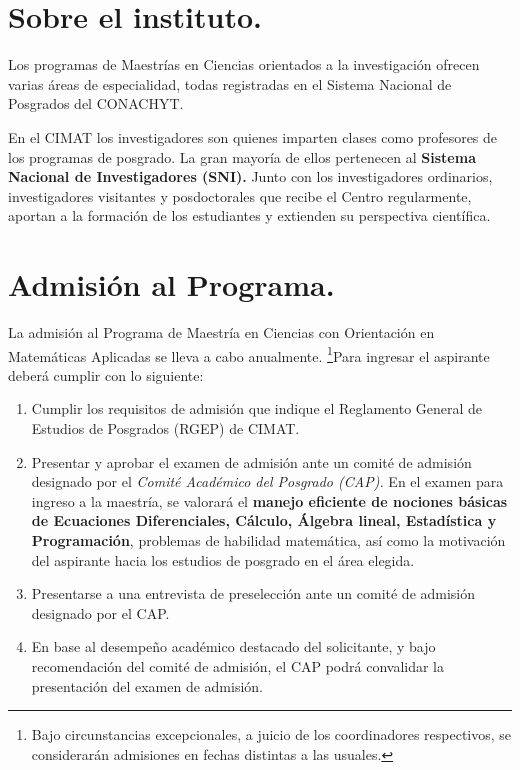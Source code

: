 \documentclass[10pt,a4paper]{article}
\title{\titulaso{Maestría en Ciencias con Orientación en Matemáticas Aplicadas}}
\author{natetas}
\date{}
\begin{document}
\maketitle
\newpage
\tableofcontents
\newpage
\section{Sobre el instituto.}
Los programas de Maestrías en Ciencias orientados a la investigación ofrecen varias áreas de especialidad, todas registradas en el Sistema Nacional de Posgrados del CONACHYT.

En el CIMAT los investigadores son quienes imparten clases como profesores de los programas de posgrado. La gran mayoría de ellos pertenecen al \textbf{Sistema Nacional de Investigadores (SNI).} Junto con los investigadores ordinarios, investigadores visitantes y posdoctorales que recibe el Centro regularmente, aportan a la formación de los estudiantes y extienden su perspectiva científica.

\section{Admisión al Programa.}
La admisión al Programa de Maestría en Ciencias con Orientación en Matemáticas Aplicadas se lleva a cabo anualmente. \footnote{Bajo circunstancias excepcionales, a juicio de los coordinadores respectivos, se considerarán admisiones en fechas distintas a las usuales. }Para ingresar el aspirante deberá cumplir con lo siguiente: 

\begin{enumerate}
	\item Cumplir los requisitos de admisión que indique el Reglamento General de Estudios de Posgrados (RGEP) de CIMAT.
	
	\item Presentar y aprobar el examen de admisión ante un comité de admisión designado por el \textit{Comité Académico del Posgrado (CAP).} En el examen para ingreso a la maestría, se valorará el \textbf{manejo eficiente de nociones básicas de Ecuaciones Diferenciales, Cálculo, Álgebra lineal, Estadística y Programación}, problemas de habilidad matemática, así como la motivación del aspirante hacia los estudios de posgrado en el área elegida.
	
	\item Presentarse a una entrevista de preselección ante un comité de admisión designado por el CAP.
	
	\item En base al desempeño académico destacado del solicitante, y bajo recomendación del comité de admisión, el CAP podrá convalidar la presentación del examen de admisión.  
\end{enumerate}
\newpage
\end{document}
